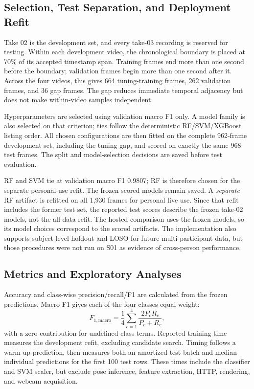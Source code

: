 \documentclass[conference]{IEEEtran}
\begin{document}
\subsection{Selection, Test Separation, and Deployment Refit}
Take 02 is the development set, and every take-03 recording is reserved for testing. Within each development video, the chronological boundary is placed at 70\% of its accepted timestamp span. Training frames end more than one second before the boundary; validation frames begin more than one second after it. Across the four videos, this gives 664 tuning-training frames, 262 validation frames, and 36 gap frames. The gap reduces immediate temporal adjacency but does not make within-video samples independent.

Hyperparameters are selected using validation macro F1 only. A model family is also selected on that criterion; ties follow the deterministic RF/SVM/XGBoost listing order. All chosen configurations are then fitted on the complete 962-frame development set, including the tuning gap, and scored on exactly the same 968 test frames. The split and model-selection decisions are saved before test evaluation.

RF and SVM tie at validation macro F1 0.9807; RF is therefore chosen for the separate personal-use refit. The frozen scored models remain saved. A \emph{separate} RF artifact is refitted on all 1,930 frames for personal live use. Since that refit includes the former test set, the reported test scores describe the frozen take-02 models, not the all-data refit. The hosted comparison uses the frozen models, so its model choices correspond to the scored artifacts. The implementation also supports subject-level holdout and LOSO for future multi-participant data, but those procedures were not run on S01 as evidence of cross-person performance.

\subsection{Metrics and Exploratory Analyses}
Accuracy and class-wise precision/recall/F1 are calculated from the frozen predictions. Macro F1 gives each of the four classes equal weight:
\begin{equation}
F_{1,\mathrm{macro}}=\frac{1}{4}\sum_{c=1}^4\frac{2P_cR_c}{P_c+R_c},
\end{equation}
with a zero contribution for undefined class terms. Reported training time measures the development refit, excluding candidate search. Timing follows a warm-up prediction, then measures both an amortized test batch and median individual predictions for the first 100 test rows. These times include the classifier and SVM scaler, but exclude pose inference, feature extraction, HTTP, rendering, and webcam acquisition.
\end{document}
